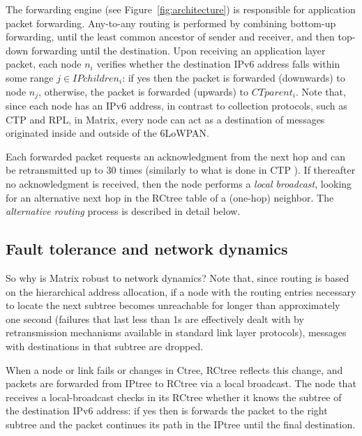 The forwarding engine (see Figure~\ref{fig:architecture}) is responsible for
application packet forwarding. Any-to-any routing is performed by combining
  bottom-up forwarding, until the least common ancestor of sender and
  receiver, and then top-down forwarding until the destination. Upon receiving
  an application layer packet, each node $n_i$ verifies whether the destination IPv6 address falls within some range
$j \in IPchildren_i$: if yes then the packet is forwarded
(downwards) to node $n_j$, otherwise, the packet is forwarded
(upwards) to $CTparent_i$. Note that, since each node has an IPv6
address, in contrast to collection protocols, such as CTP and RPL,
in Matrix, every node can act as a destination of messages
originated inside and outside of the 6LoWPAN.

Each forwarded packet requests an acknowledgment from the next hop and can be
retransmitted up to 30 times (similarly to what is done in CTP
\cite{Fonseca:2009}). If thereafter no acknowledgment
is received, then the node performs a \textit{local broadcast}, looking for an
alternative next hop in the RCtree table of a (one-hop) neighbor. The
\textit{alternative routing} process is described in detail below.


\subsection{Fault tolerance and network dynamics}


So why is Matrix robust to network dynamics? Note that, since
routing is based on the hierarchical address allocation, if a node
with the routing entries necessary to locate the next subtree
becomes unreachable for longer than approximately one second
(failures that last less than 1s are effectively dealt with by
retransmission mechanisms available in standard link layer
protocols), messages with destinations in that subtree are dropped.

When a node or link fails or changes in Ctree, RCtree reflects this
change, and packets are forwarded from IPtree to RCtree via a local
broadcast. The node that receives a local-broadcast checks in its
RCtree whether it knows the subtree of the destination IPv6 address:
if yes then is forwards the packet to the right subtree and the
packet continues its path in the IPtree until the final destination.

